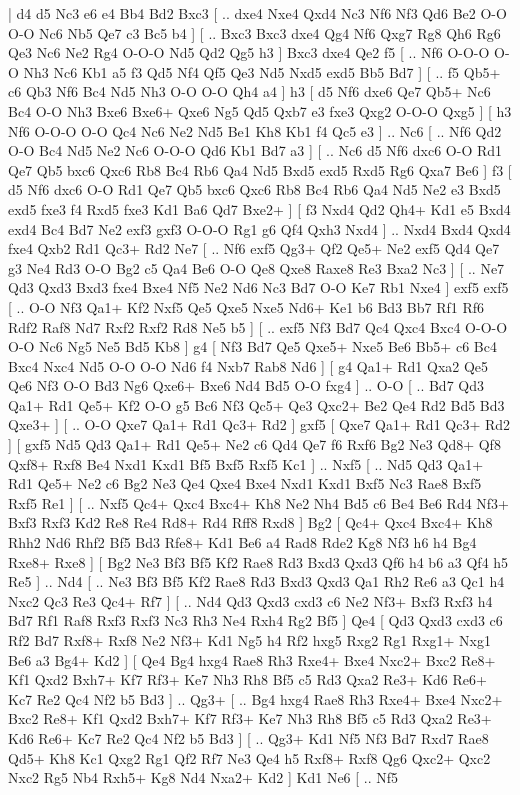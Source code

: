 \makegametitle 
|   d4   d5    Nc3   e6    e4   Bb4   Bd2  Bxc3 [ .. dxe4  Nxe4 Qxd4  Nc3 Nf6  Nf3 Qd6  Be2 O-O  O-O Nc6  Nb5 Qe7  c3 Bc5  b4   ]  [ .. Bxc3  Bxc3 dxe4  Qg4 Nf6  Qxg7 Rg8  Qh6 Rg6  Qe3 Nc6  Ne2 Rg4  O-O-O Nd5  Qd2 Qg5  h3   ]  Bxc3   dxe4    Qe2   f5 [ .. Nf6  O-O-O O-O  Nh3 Nc6  Kb1 a5  f3 Qd5  Nf4 Qf5  Qe3 Nd5  Nxd5 exd5  Bb5 Bd7   ]  [ .. f5  Qb5+ c6  Qb3 Nf6  Bc4 Nd5  Nh3 O-O  O-O Qh4  a4   ]  h3 [  d5 Nf6  dxe6 Qe7  Qb5+ Nc6  Bc4 O-O  Nh3 Bxe6  Bxe6+ Qxe6  Ng5 Qd5  Qxb7 e3  fxe3 Qxg2  O-O-O Qxg5   ]  [  h3 Nf6  O-O-O O-O  Qc4 Nc6  Ne2 Nd5  Be1 Kh8  Kb1 f4  Qc5 e3   ] .. Nc6 [ .. Nf6  Qd2 O-O  Bc4 Nd5  Ne2 Nc6  O-O-O Qd6  Kb1 Bd7  a3   ]  [ .. Nc6  d5 Nf6  dxc6 O-O  Rd1 Qe7  Qb5 bxc6  Qxc6 Rb8  Bc4 Rb6  Qa4 Nd5  Bxd5 exd5  Rxd5 Rg6  Qxa7 Be6   ]  f3 [  d5 Nf6  dxc6 O-O  Rd1 Qe7  Qb5 bxc6  Qxc6 Rb8  Bc4 Rb6  Qa4 Nd5  Ne2 e3  Bxd5 exd5  fxe3 f4  Rxd5 fxe3  Kd1 Ba6  Qd7 Bxe2+   ]  [  f3 Nxd4  Qd2 Qh4+  Kd1 e5  Bxd4 exd4  Bc4 Bd7  Ne2 exf3  gxf3 O-O-O  Rg1 g6  Qf4 Qxh3  Nxd4   ] .. Nxd4    Bxd4   Qxd4    fxe4   Qxb2    Rd1   Qc3+    Rd2   Ne7 [ .. Nf6  exf5 Qg3+  Qf2 Qe5+  Ne2 exf5  Qd4 Qe7  g3 Ne4  Rd3 O-O  Bg2 c5  Qa4 Be6  O-O Qe8  Qxe8 Raxe8  Re3 Bxa2  Nc3   ]  [ .. Ne7  Qd3 Qxd3  Bxd3 fxe4  Bxe4 Nf5  Ne2 Nd6  Nc3 Bd7  O-O Ke7  Rb1 Nxe4   ]  exf5   exf5 [ .. O-O  Nf3 Qa1+  Kf2 Nxf5  Qe5 Qxe5  Nxe5 Nd6+  Ke1 b6  Bd3 Bb7  Rf1 Rf6  Rdf2 Raf8  Nd7 Rxf2  Rxf2 Rd8  Ne5 b5   ]  [ .. exf5  Nf3 Bd7  Qc4 Qxc4  Bxc4 O-O-O  O-O Nc6  Ng5 Ne5  Bd5 Kb8   ]  g4 [  Nf3 Bd7  Qe5 Qxe5+  Nxe5 Be6  Bb5+ c6  Bc4 Bxc4  Nxc4 Nd5  O-O O-O  Nd6 f4  Nxb7 Rab8  Nd6   ]  [  g4 Qa1+  Rd1 Qxa2  Qe5 Qe6  Nf3 O-O  Bd3 Ng6  Qxe6+ Bxe6  Nd4 Bd5  O-O fxg4   ] .. O-O [ .. Bd7  Qd3 Qa1+  Rd1 Qe5+  Kf2 O-O  g5 Bc6  Nf3 Qc5+  Qe3 Qxc2+  Be2 Qe4  Rd2 Bd5  Bd3 Qxe3+   ]  [ .. O-O  Qxe7 Qa1+  Rd1 Qc3+  Rd2   ]  gxf5 [  Qxe7 Qa1+  Rd1 Qc3+  Rd2   ]  [  gxf5 Nd5  Qd3 Qa1+  Rd1 Qe5+  Ne2 c6  Qd4 Qe7  f6 Rxf6  Bg2 Ne3  Qd8+ Qf8  Qxf8+ Rxf8  Be4 Nxd1  Kxd1 Bf5  Bxf5 Rxf5  Kc1   ] .. Nxf5 [ .. Nd5  Qd3 Qa1+  Rd1 Qe5+  Ne2 c6  Bg2 Ne3  Qe4 Qxe4  Bxe4 Nxd1  Kxd1 Bxf5  Nc3 Rae8  Bxf5 Rxf5  Re1   ]  [ .. Nxf5  Qc4+ Qxc4  Bxc4+ Kh8  Ne2 Nh4  Bd5 c6  Be4 Be6  Rd4 Nf3+  Bxf3 Rxf3  Kd2 Re8  Re4 Rd8+  Rd4 Rff8  Rxd8   ]  Bg2 [  Qc4+ Qxc4  Bxc4+ Kh8  Rhh2 Nd6  Rhf2 Bf5  Bd3 Rfe8+  Kd1 Be6  a4 Rad8  Rde2 Kg8  Nf3 h6  h4 Bg4  Rxe8+ Rxe8   ]  [  Bg2 Ne3  Bf3 Bf5  Kf2 Rae8  Rd3 Bxd3  Qxd3 Qf6  h4 b6  a3 Qf4  h5 Re5   ] .. Nd4 [ .. Ne3  Bf3 Bf5  Kf2 Rae8  Rd3 Bxd3  Qxd3 Qa1  Rh2 Re6  a3 Qc1  h4 Nxc2  Qc3 Re3  Qc4+ Rf7   ]  [ .. Nd4  Qd3 Qxd3  cxd3 c6  Ne2 Nf3+  Bxf3 Rxf3  h4 Bd7  Rf1 Raf8  Rxf3 Rxf3  Nc3 Rh3  Ne4 Rxh4  Rg2 Bf5   ]  Qe4 [  Qd3 Qxd3  cxd3 c6  Rf2 Bd7  Rxf8+ Rxf8  Ne2 Nf3+  Kd1 Ng5  h4 Rf2  hxg5 Rxg2  Rg1 Rxg1+  Nxg1 Be6  a3 Bg4+  Kd2   ]  [  Qe4 Bg4  hxg4 Rae8  Rh3 Rxe4+  Bxe4 Nxc2+  Bxc2 Re8+  Kf1 Qxd2  Bxh7+ Kf7  Rf3+ Ke7  Nh3 Rh8  Bf5 c5  Rd3 Qxa2  Re3+ Kd6  Re6+ Kc7  Re2 Qc4  Nf2 b5  Bd3   ] .. Qg3+ [ .. Bg4  hxg4 Rae8  Rh3 Rxe4+  Bxe4 Nxc2+  Bxc2 Re8+  Kf1 Qxd2  Bxh7+ Kf7  Rf3+ Ke7  Nh3 Rh8  Bf5 c5  Rd3 Qxa2  Re3+ Kd6  Re6+ Kc7  Re2 Qc4  Nf2 b5  Bd3   ]  [ .. Qg3+  Kd1 Nf5  Nf3 Bd7  Rxd7 Rae8  Qd5+ Kh8  Kc1 Qxg2  Rg1 Qf2  Rf7 Ne3  Qe4 h5  Rxf8+ Rxf8  Qg6 Qxc2+  Qxc2 Nxc2  Rg5 Nb4  Rxh5+ Kg8  Nd4 Nxa2+  Kd2   ]  Kd1   Ne6 [ .. Nf5  